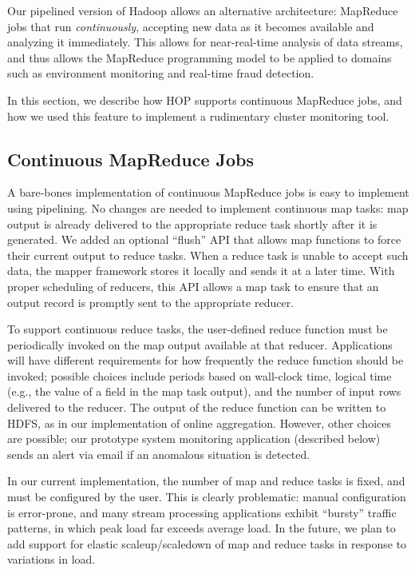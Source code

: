 Our pipelined version of Hadoop allows an alternative architecture:
MapReduce jobs that run {\em continuously}, accepting new data as it
becomes available and analyzing it immediately. This allows for near-real-time
analysis of data streams, and thus
allows the MapReduce programming model to be applied to domains such
as environment monitoring and real-time fraud detection.

In this section, we describe how HOP supports continuous MapReduce
jobs, and how we used this feature to implement a rudimentary
cluster monitoring tool.

\subsection{Continuous MapReduce Jobs}
A bare-bones implementation of continuous MapReduce jobs is easy to
implement using pipelining. No changes are needed to implement
continuous map tasks: map output is already delivered to the
appropriate reduce task shortly after it is generated. We added an
optional ``flush'' API that allows map functions to force their current
output to reduce tasks. When a reduce task is unable to accept such data, the mapper framework
stores it locally and sends it at a later time. 
With proper scheduling of reducers, this API allows a map task to ensure that an output record is promptly sent to the appropriate
reducer.

To support continuous reduce tasks, the user-defined reduce function
must be periodically invoked on the map output available at that
reducer. Applications will have different requirements for how
frequently the reduce function should be invoked; possible choices
include periods based on wall-clock time, logical time (e.g., the
value of a field in the map task output), and the number of input rows
delivered to the reducer. The output of the reduce function can be
written to HDFS, as in our implementation of online
aggregation. However, other choices are possible; our prototype system
monitoring application (described below) sends an alert via email if
an anomalous situation is detected.

In our current implementation, the number of map and reduce tasks is
fixed, and must be configured by the user. This is clearly
problematic: manual configuration is error-prone, and many stream
processing applications exhibit ``bursty'' traffic patterns, in which
peak load far exceeds average load. In the future, we plan to add
support for elastic scaleup/scaledown of map and reduce tasks in
response to variations in load.

